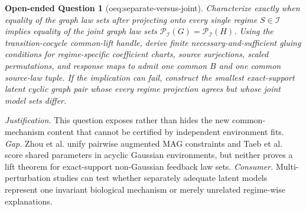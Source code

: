 \documentclass{article}
\newtheorem{openendedquestion}{Open-ended Question}
\begin{document}
\begin{openendedquestion}[oeq:separate-versus-joint]\label{oeq:separate-versus-joint}
Characterize exactly when equality of the graph law sets after projecting onto every single regime \(S\in\mathcal I\) implies equality of the joint graph law sets \(\mathcal P_{\mathcal I}(G)=\mathcal P_{\mathcal I}(H)\). Using the transition-cocycle common-lift handle, derive finite necessary-and-sufficient gluing conditions for regime-specific coefficient charts, source surjections, scaled permutations, and response maps to admit one common \(B\) and one common source-law tuple. If the implication can fail, construct the smallest exact-support latent cyclic graph pair whose every regime projection agrees but whose joint model sets differ.
\end{openendedquestion}
\par\smallskip\noindent \textit{Justification.} This question exposes rather than hides the new common-mechanism content that cannot be certified by independent environment fits. \textit{Gap.} Zhou et al. unify pairwise augmented MAG constraints and Taeb et al. score shared parameters in acyclic Gaussian environments, but neither proves a lift theorem for exact-support non-Gaussian feedback law sets. \textit{Consumer.} Multi-perturbation studies can test whether separately adequate latent models represent one invariant biological mechanism or merely unrelated regime-wise explanations.
\end{document}
